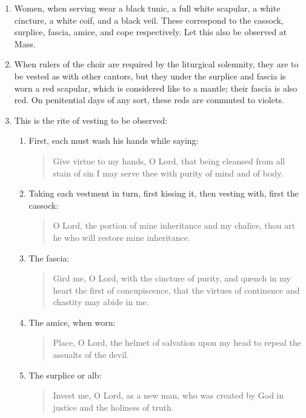 \begin{enumerate}
			\item Women, when serving wear a black tunic, a full white scapular, a white cincture, a white coif, and a black veil. These correspond to the cassock, surplice, fascia, amice, and cope respectively. Let this also be observed at Mass.
			
			\item When rulers of the choir are required by the liturgical solemnity, they are to be vested as with other cantors, but they under the surplice and fascia is worn a red scapular, which is considered like to a mantle; their fascia is also red. On penitential days of any sort, these reds are commuted to violets.
			
			\item This is the rite of vesting to be observed:
			
				\begin{enumerate}
					\item First, each must wash his hands while saying: \begin{quote}
						Give virtue to my hands, O Lord, that being cleansed from all stain of sin I may serve thee with purity of mind and of body.
					\end{quote}
				
					\item Taking each vestment in turn, first kissing it, then vesting with, first the cassock: \begin{quote}
						O Lord, the portion of mine inheritance and my chalice, thou art he who will restore mine inheritance.
					\end{quote}
				
					\item The fascia: \begin{quote}
						Gird me, O Lord, with the cincture of purity, and quench in my heart the first of concupiscence, that the virtues of continence and chastity may abide in me.
					\end{quote}
				
					\item The amice, when worn: \begin{quote}
						Place, O Lord, the helmet of salvation upon my head to repeal the assualts of the devil.
					\end{quote}
				
					\item The surplice or alb: \begin{quote}
						Invest me, O Lord, as a new man, who was created by God in justice and the holiness of truth.
					\end{quote}
				

\end{enumerate}
\end{enumerate}
